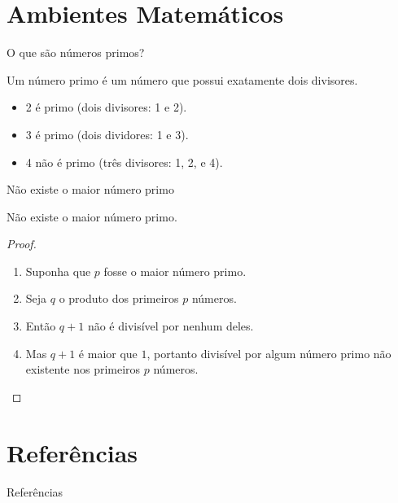 \documentclass{beamer}
\begin{document}
\section{Ambientes Matemáticos}

\begin{frame}{O que são números primos?}
  \begin{definition}
    Um \alert{número primo} é um número que possui exatamente dois divisores.
  \end{definition}
  \begin{example}
    \begin{itemize}
    \item 2 é primo (dois divisores: 1 e 2).
    \item 3 é primo (dois dividores: 1 e 3).
    \item 4 não é primo (\alert{três} divisores: 1, 2, e 4).
    \end{itemize}
  \end{example}
\end{frame}

\begin{frame}{Não existe o maior número primo}
  \begin{theorem}
    Não existe o maior número primo.
  \end{theorem}
  \begin{proof}
    \begin{enumerate}
      \item Suponha que $p$ fosse o maior número primo.
      \item Seja $q$ o produto dos primeiros $p$ números.
      \item Então $q + 1$ não é divisível por nenhum deles.
      \item Mas $q + 1$ é maior que $1$, portanto divisível por algum número primo não existente nos primeiros $p$ números.\qedhere
    \end{enumerate}
  \end{proof}
\end{frame}

\section{Referências}

\begin{frame}[allowframebreaks]{Referências}
  
\end{frame}
\end{document}
